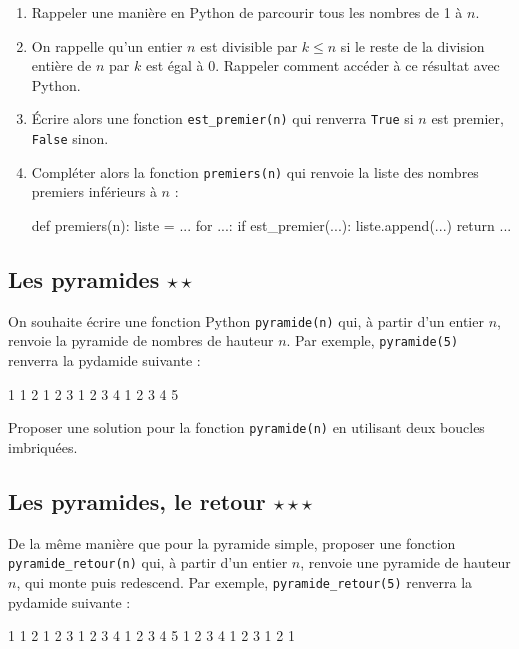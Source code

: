 \documentclass[12pt,a4paper, oneside]{article}
\theoremstyle{definition}
\begin{document}
   \begin{enumerate}
      \item Rappeler une manière en Python de parcourir tous les nombres de 1 à $n$.
      \item On rappelle qu'un entier $n$ est divisible par $k \leq n$ si le reste de la division entière de $n$ par $k$ est égal à 0.
      Rappeler comment accéder à ce résultat avec Python.
      \item Écrire alors une fonction \texttt{est\_premier(n)} qui renverra \texttt{True} si $n$ est premier, \texttt{False} sinon.
      \item Compléter alors la fonction \texttt{premiers(n)} qui renvoie la liste des nombres premiers inférieurs à $n$ :
      \begin{pyverbatim}
         def premiers(n):
            liste = ...
            for ...:
               if est_premier(...):
                  liste.append(...)
            return ...
      \end{pyverbatim}
   \end{enumerate}

   \subsection{Les pyramides $\star\star$}\label{subsec:pyramides}
   On souhaite écrire une fonction Python \texttt{pyramide(n)} qui, à partir d'un entier $n$, renvoie la pyramide de nombres de hauteur $n$.
   Par exemple, \texttt{pyramide(5)} renverra la pydamide suivante :
   \begin{pyverbatim}
      1
      1 2
      1 2 3
      1 2 3 4
      1 2 3 4 5
   \end{pyverbatim}
   Proposer une solution pour la fonction \texttt{pyramide(n)} en utilisant deux boucles imbriquées.

   \subsection{Les pyramides, le retour $\star\star\star$}\label{subsec:pyramides-retour}
   De la même manière que pour la pyramide simple, proposer une fonction \texttt{pyramide\_retour(n)} qui, à partir d'un entier $n$, renvoie une pyramide de hauteur $n$, qui monte puis redescend.
   Par exemple, \texttt{pyramide\_retour(5)} renverra la pydamide suivante :
   \begin{pyverbatim}
      1
      1 2
      1 2 3
      1 2 3 4
      1 2 3 4 5
      1 2 3 4
      1 2 3
      1 2
      1
   \end{pyverbatim}
\end{document}
